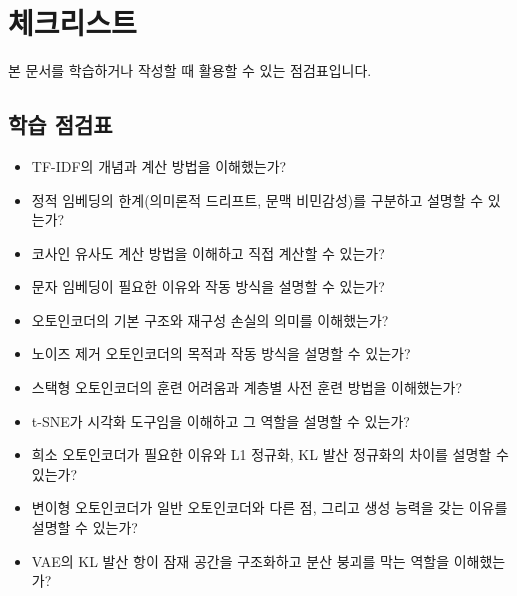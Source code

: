 \documentclass[11pt,a4paper]{article}
\begin{document}
\newpage
\section{체크리스트}
본 문서를 학습하거나 작성할 때 활용할 수 있는 점검표입니다.

\subsection{학습 점검표}
\begin{itemize}
    \item TF-IDF의 개념과 계산 방법을 이해했는가?
    \item 정적 임베딩의 한계(의미론적 드리프트, 문맥 비민감성)를 구분하고 설명할 수 있는가?
    \item 코사인 유사도 계산 방법을 이해하고 직접 계산할 수 있는가?
    \item 문자 임베딩이 필요한 이유와 작동 방식을 설명할 수 있는가?
    \item 오토인코더의 기본 구조와 재구성 손실의 의미를 이해했는가?
    \item 노이즈 제거 오토인코더의 목적과 작동 방식을 설명할 수 있는가?
    \item 스택형 오토인코더의 훈련 어려움과 계층별 사전 훈련 방법을 이해했는가?
    \item t-SNE가 시각화 도구임을 이해하고 그 역할을 설명할 수 있는가?
    \item 희소 오토인코더가 필요한 이유와 L1 정규화, KL 발산 정규화의 차이를 설명할 수 있는가?
    \item 변이형 오토인코더가 일반 오토인코더와 다른 점, 그리고 생성 능력을 갖는 이유를 설명할 수 있는가?
    \item VAE의 KL 발산 항이 잠재 공간을 구조화하고 분산 붕괴를 막는 역할을 이해했는가?
\end{itemize}
\end{document}
